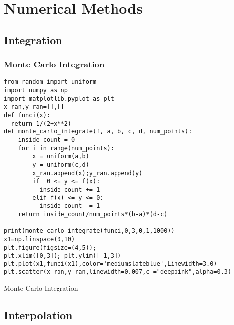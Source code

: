 \chapter{Numerical Methods}
\section{Integration}
\subsection{Monte Carlo Integration}
\begin{listing}[ht!]
\begin{verbatim}
from random import uniform
import numpy as np
import matplotlib.pyplot as plt
x_ran,y_ran=[],[]
def funci(x):
  return 1/(2+x**2)  
def monte_carlo_integrate(f, a, b, c, d, num_points):
    inside_count = 0
    for i in range(num_points):
        x = uniform(a,b)
        y = uniform(c,d)
        x_ran.append(x);y_ran.append(y)
        if  0 <= y <= f(x):
          inside_count += 1
        elif f(x) <= y <= 0:
          inside_count -= 1
    return inside_count/num_points*(b-a)*(d-c)

print(monte_carlo_integrate(funci,0,3,0,1,1000))
x1=np.linspace(0,10)
plt.figure(figsize=(4,5));
plt.xlim([0,3]); plt.ylim([-1,3])
plt.plot(x1,funci(x1),color='mediumslateblue',Linewidth=3.0)
plt.scatter(x_ran,y_ran,linewidth=0.007,c ="deeppink",alpha=0.3)
\end{verbatim}
\caption{Monte-Carlo Integration}
\end{listing}

\section{Interpolation}
